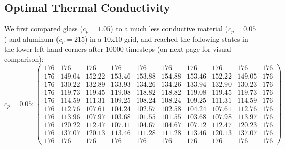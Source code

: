\documentclass[12pt,draft]{reedmcm}
\begin{document}
\subsection{Optimal Thermal Conductivity}
We first compared glass ($c_p = 1.05$) to a much less conductive material ($c_p = 0.05$) and aluminum ($c_p = 215$) in a 10x10 grid, and reached the following states in the lower left hand corners after 10000 timesteps (on next page for visual comparison):\newpage
\[c_p = 0.05: \begin{pmatrix} 176&176&176&176&176&176&176&176&176&176\\
176&149.04&152.22&153.46&153.88&154.88&153.46&152.22&149.05&176\\
176&130.22&132.89&133.93&134.26&134.26&133.94&132.90&130.23&176\\
176&119.73&119.45&119.08&118.82&118.82&119.08&119.45&119.73&176\\
176&114.59&111.31&109.25&108.24&108.24&109.25&111.31&114.59&176\\
176&112.76&107.61&104.24&102.57&102.58&104.24&107.61&112.76&176\\
176&113.96&107.97&103.68&101.55&101.55&103.68&107.98&113.97&176\\
176&120.22&112.47&107.11&104.67&104.67&107.12&112.47&120.23&176\\
176&137.07&120.13&113.46&111.28&111.28&113.46&120.13&137.07&176\\
176&176&176&176&176&176&176&176&176&176\end{pmatrix}\]
\end{document}
